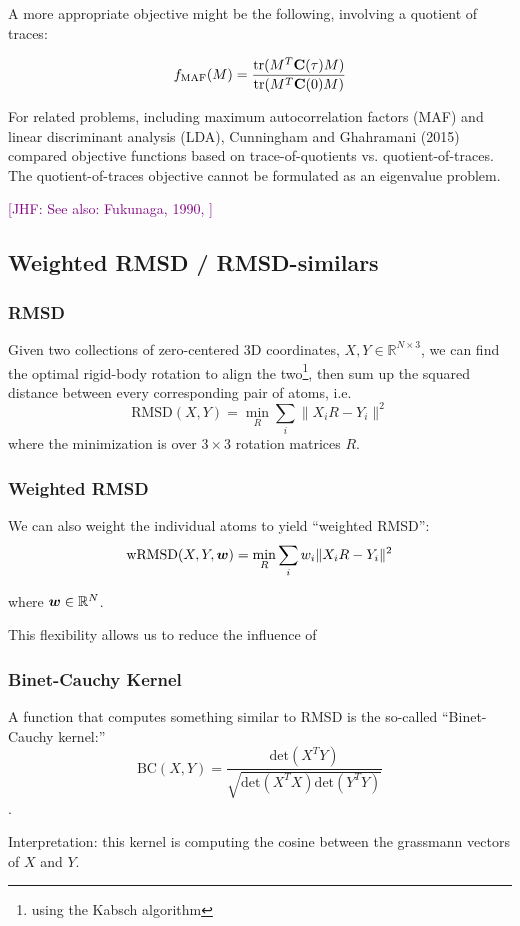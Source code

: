 \documentclass[aps,prl,preprint,nofootinbib,superscriptaddress,linenumbers]{revtex4-1}
\newcommand{\bfv}[1]{{\mbox{\boldmath{$#1$}}}}
\newcommand{\bfm}[1]{{\bf #1}}
\newcommand{\jhfcomment}[1]{\textcolor{purple}{[JHF: #1]}} 	%
\begin{document}
A more appropriate objective might be the following, involving a quotient of traces:

$$ f_{\text{MAF}}(M) = \frac{\text{tr}(M^T \bfm{C}(\tau) M)}{\text{tr}(M^T \bfm{C}(0) M)}$$

For related problems, including maximum autocorrelation factors (MAF) and linear discriminant analysis (LDA), Cunningham and Ghahramani (2015) compared objective functions based on trace-of-quotients vs. quotient-of-traces. The quotient-of-traces objective cannot be formulated as an eigenvalue problem.

\jhfcomment{See also: Fukunaga, 1990, }

\subsection{Weighted RMSD / RMSD-similars}
\subsubsection{RMSD}
Given two collections of zero-centered 3D coordinates, $X,Y \in \mathbb{R}^{N \times 3}$, we can find the optimal rigid-body rotation to align the two\footnote{using the Kabsch algorithm}, then sum up the squared distance between every corresponding pair of atoms, i.e.
$$ \text{RMSD}(X,Y) = \min_R \sum_i \| X_i R - Y_i \|^2 $$
where the minimization is over $3 \times 3$ rotation matrices $R$.

\subsubsection{Weighted RMSD}
We can also weight the individual atoms to yield ``weighted RMSD'':
$$ \text{wRMSD}(X,Y,\bfv{w}) = \min_R \sum_i w_i \| X_i R - Y_i \|^2 $$

where $ \bfv{w} \in \mathbb{R}^N$.

This flexibility allows us to reduce the influence of 

\subsubsection{Binet-Cauchy Kernel}
A function that computes something similar to RMSD is the so-called ``Binet-Cauchy kernel:''
$$ \text{BC}(X,Y) = \frac{\text{det}(X^T Y)}{\sqrt{\text{det}(X^T X) \text{det}(Y^T Y)}} $$.

Interpretation: this kernel is computing the cosine between the grassmann vectors of $X$ and $Y$.
\end{document}
